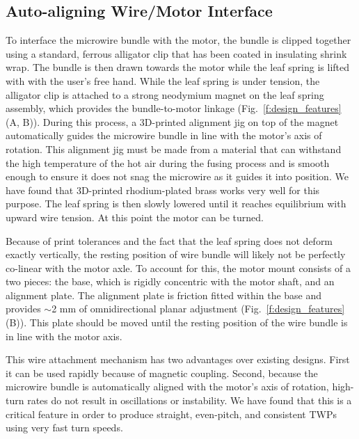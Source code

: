 \documentclass[11pt,a4paper]{article}
\begin{document}
\subsection{Auto-aligning Wire/Motor Interface}
To interface the microwire bundle with the motor, the bundle is clipped
together using a standard, ferrous alligator clip that has been coated in
insulating shrink wrap. The bundle is then drawn towards the motor while the
leaf spring is lifted with with the user's free hand. While the leaf spring is
under tension, the alligator clip is attached to a strong neodymium magnet on
the leaf spring assembly, which provides the bundle-to-motor linkage
(Fig.~\ref{f:design_features} (A, B)). During this process, a 3D-printed
alignment jig on top of the magnet automatically guides the microwire bundle in
line with the motor's axis of rotation. This alignment jig must be made from a
material that can withstand the high temperature of the hot air during the
fusing process and is smooth enough to ensure it does not snag the microwire as
it guides it into position. We have found that 3D-printed rhodium-plated brass
works very well for this purpose. The leaf spring is then slowly lowered until
it reaches equilibrium with upward wire tension. At this point the motor can be
turned.

Because of print tolerances and the fact that the leaf spring does not deform
exactly vertically, the resting position of wire bundle will likely not be
perfectly co-linear with the motor axle. To account for this, the motor mount
consists of a two pieces: the base, which is rigidly concentric with the motor
shaft, and an alignment plate. The alignment plate is friction fitted within
the base and provides $\sim$2 mm of omnidirectional planar adjustment
(Fig.~\ref{f:design_features} (B)). This plate should be moved until the
resting position of the wire bundle is in line with the motor axis.

This wire attachment mechanism has two advantages over existing designs. First
it can be used rapidly because of magnetic coupling. Second, because the
microwire bundle is automatically aligned with the motor's axis of rotation,
high-turn rates do not result in oscillations or instability. We have found
that this is a critical feature in order to produce straight, even-pitch, and
consistent TWPs using very fast turn speeds.
\end{document}
